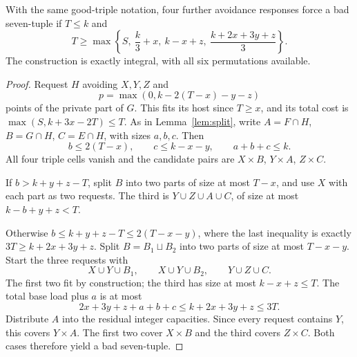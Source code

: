 \begin{lemma}\label{lem:asymtwo}
With the same good-triple notation, four further avoidance responses force a bad seven-tuple if $T\le k$ and
\[
T\ge\max\left\{S,\ \frac k3+x,\ k-x+z,\ \frac{k+2x+3y+z}{3}\right\}.
\]
The construction is exactly integral, with all six permutations available.
\end{lemma}
\begin{proof}
Request $H$ avoiding $X,Y,Z$ and
\[
p=\max(0,k-2(T-x)-y-z)
\]
points of the private part of $G$. This fits its host since $T\ge x$, and its total cost is $\max(S,k+3x-2T)\le T$. As in Lemma~\ref{lem:split}, write $A=F\cap H$, $B=G\cap H$, $C=E\cap H$, with sizes $a,b,c$. Then
\[
b\le2(T-x),\qquad c\le k-x-y,\qquad a+b+c\le k.
\]
All four triple cells vanish and the candidate pairs are $X\times B$, $Y\times A$, $Z\times C$.

If $b>k+y+z-T$, split $B$ into two parts of size at most $T-x$, and use $X$ with each part as two requests. The third is $Y\cup Z\cup A\cup C$, of size at most $k-b+y+z<T$.

Otherwise $b\le k+y+z-T\le2(T-x-y)$, where the last inequality is exactly $3T\ge k+2x+3y+z$. Split $B=B_1\sqcup B_2$ into two parts of size at most $T-x-y$. Start the three requests with
\[
X\cup Y\cup B_1,\qquad X\cup Y\cup B_2,\qquad Y\cup Z\cup C.
\]
The first two fit by construction; the third has size at most $k-x+z\le T$. The total base load plus $a$ is at most
\[
2x+3y+z+a+b+c\le k+2x+3y+z\le3T.
\]
Distribute $A$ into the residual integer capacities. Since every request contains $Y$, this covers $Y\times A$. The first two cover $X\times B$ and the third covers $Z\times C$. Both cases therefore yield a bad seven-tuple.
\end{proof}

